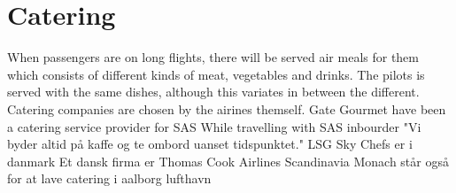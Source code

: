 \section{Catering} 
When passengers are on long flights, there will be served air meals for them which consists of different kinds of meat, vegetables and drinks. The pilots is served with the same dishes, although this variates in between the different\cite{cate_pilotfood1}\cite{cate_pilotfood2}.
Catering companies are chosen by the airines themself.
Gate Gourmet have been a catering service provider for SAS
While travelling with SAS inbourder "Vi byder altid på kaffe og te ombord uanset tidspunktet."
LSG Sky Chefs er i danmark
Et dansk firma er Thomas Cook Airlines Scandinavia
Monach står også for at lave catering i aalborg lufthavn